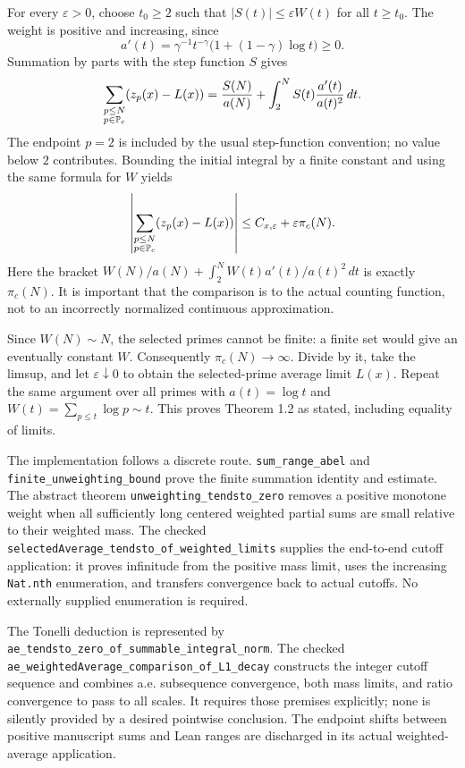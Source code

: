 For every $\varepsilon>0$, choose $t_0\geq2$ such that $|S(t)|\leq\varepsilon W(t)$ for all $t\geq t_0$. The weight is positive and increasing, since
\[
 a'(t)=\gamma^{-1}t^{-\gamma}\bigl(1+(1-\gamma)\log t\bigr)\geq0.
\]
Summation by parts with the step function $S$ gives
\[
 \sum_{\substack{p\leq N\\p\in\mathbb P_c}}(z_p(x)-L(x))
 =\frac{S(N)}{a(N)}+\int_2^N S(t)\frac{a'(t)}{a(t)^2}\,dt.
\]
The endpoint $p=2$ is included by the usual step-function convention; no value below $2$ contributes. Bounding the initial integral by a finite constant and using the same formula for $W$ yields
\[
 \left|\sum_{\substack{p\leq N\\p\in\mathbb P_c}}(z_p(x)-L(x))\right|
 \leq C_{x,\varepsilon}+\varepsilon\pi_c(N).
\]
Here the bracket $W(N)/a(N)+\int_2^N W(t)a'(t)/a(t)^2\,dt$ is exactly $\pi_c(N)$. It is important that the comparison is to the actual counting function, not to an incorrectly normalized continuous approximation.

Since $W(N)\sim N$, the selected primes cannot be finite: a finite set would give an eventually constant $W$. Consequently $\pi_c(N)\to\infty$. Divide by it, take the limsup, and let $\varepsilon\downarrow0$ to obtain the selected-prime average limit $L(x)$. Repeat the same argument over all primes with $a(t)=\log t$ and $W(t)=\sum_{p\leq t}\log p\sim t$. This proves Theorem 1.2 as stated, including equality of limits.

The implementation follows a discrete route. \texttt{sum\_\allowbreak{}range\_\allowbreak{}abel} and \texttt{finite\_\allowbreak{}unweighting\_\allowbreak{}bound} prove the finite summation identity and estimate. The abstract theorem \texttt{unweighting\_\allowbreak{}tendsto\_\allowbreak{}zero} removes a positive monotone weight when all sufficiently long centered weighted partial sums are small relative to their weighted mass. The checked \texttt{selectedAverage\_\allowbreak{}tendsto\_\allowbreak{}of\_\allowbreak{}weighted\_\allowbreak{}limits} supplies the end-to-end cutoff application: it proves infinitude from the positive mass limit, uses the increasing \texttt{Nat.nth} enumeration, and transfers convergence back to actual cutoffs. No externally supplied enumeration is required.

The Tonelli deduction is represented by \texttt{ae\_\allowbreak{}tendsto\_\allowbreak{}zero\_\allowbreak{}of\_\allowbreak{}summable\_\allowbreak{}integral\_\allowbreak{}norm}. The checked \texttt{ae\_\allowbreak{}weightedAverage\_\allowbreak{}comparison\_\allowbreak{}of\_\allowbreak{}L1\_\allowbreak{}decay} constructs the integer cutoff sequence and combines a.e. subsequence convergence, both mass limits, and ratio convergence to pass to all scales. It requires those premises explicitly; none is silently provided by a desired pointwise conclusion. The endpoint shifts between positive manuscript sums and Lean ranges are discharged in its actual weighted-average application.

